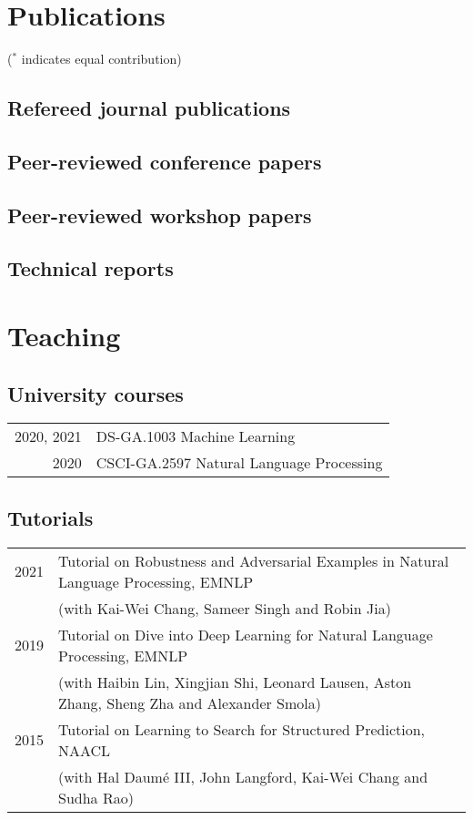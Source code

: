 \documentclass[a4paper,11pt]{article}
\begin{document}
\section{Publications}
($^*$ indicates equal contribution)
\subsection{Refereed journal publications}


\subsection{Peer-reviewed conference papers}


\subsection{Peer-reviewed workshop papers}


\subsection{Technical reports}


\section{Teaching} 
\subsection{University courses}
\begin{tabular}{rl}
2020, 2021 & DS-GA.1003 Machine Learning \\
    2020 & CSCI-GA.2597 Natural Language Processing
\end{tabular}

\subsection{Tutorials}
\begin{tabular}{rl}
    2021 & Tutorial on Robustness and Adversarial Examples in Natural Language Processing, EMNLP\\
         & (with Kai-Wei Chang, Sameer Singh and Robin Jia) \\
    2019 & Tutorial on Dive into Deep Learning for Natural Language Processing, EMNLP \\
         & (with Haibin Lin, Xingjian Shi, Leonard Lausen, Aston Zhang, Sheng Zha and Alexander Smola) \\
    2015 & Tutorial on Learning to Search for Structured Prediction, NAACL \\
         & (with Hal Daum\'e III, John Langford, Kai-Wei Chang and Sudha Rao)
\end{tabular}
\end{document}
